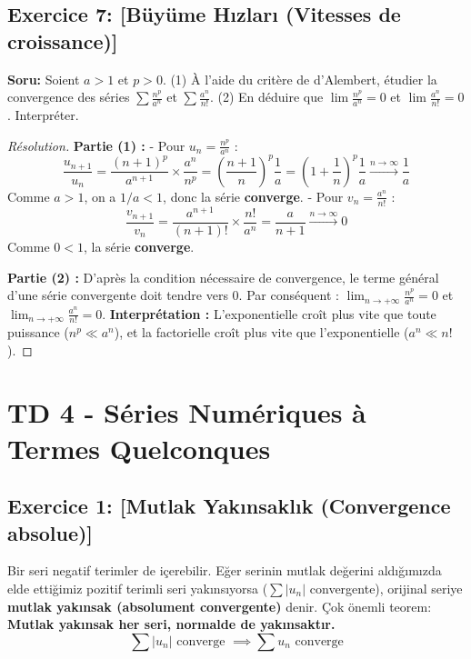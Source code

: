 \documentclass[12pt,a4paper]{report}
\begin{document}
\subsection*{Exercice 7: [Büyüme Hızları (Vitesses de croissance)]}

\textbf{Soru:}
Soient $a > 1$ et $p > 0$.
(1) À l'aide du critère de d'Alembert, étudier la convergence des séries $\sum \frac{n^p}{a^n}$ et $\sum \frac{a^n}{n!}$.
(2) En déduire que $\lim \frac{n^p}{a^n} = 0$ et $\lim \frac{a^n}{n!} = 0$. Interpréter.

\begin{proof}[Résolution]
\textbf{Partie (1) :}
- Pour $u_n = \frac{n^p}{a^n}$ :
\[ \frac{u_{n+1}}{u_n} = \frac{(n+1)^p}{a^{n+1}} \times \frac{a^n}{n^p} = \left(\frac{n+1}{n}\right)^p \frac{1}{a} = \left(1 + \frac{1}{n}\right)^p \frac{1}{a} \xrightarrow{n \to \infty} \frac{1}{a} \]
Comme $a > 1$, on a $1/a < 1$, donc la série \textbf{converge}.
- Pour $v_n = \frac{a^n}{n!}$ :
\[ \frac{v_{n+1}}{v_n} = \frac{a^{n+1}}{(n+1)!} \times \frac{n!}{a^n} = \frac{a}{n+1} \xrightarrow{n \to \infty} 0 \]
Comme $0 < 1$, la série \textbf{converge}.

\textbf{Partie (2) :}
D'après la condition nécessaire de convergence, le terme général d'une série convergente doit tendre vers 0.
Par conséquent : $\lim_{n \to +\infty} \frac{n^p}{a^n} = 0$ et $\lim_{n \to +\infty} \frac{a^n}{n!} = 0$.
\textbf{Interprétation :} L'exponentielle croît plus vite que toute puissance ($n^p \ll a^n$), et la factorielle croît plus vite que l'exponentielle ($a^n \ll n!$).
\end{proof}

\section{TD 4 - Séries Numériques à Termes Quelconques}

\subsection*{Exercice 1: [Mutlak Yakınsaklık (Convergence absolue)]}

\begin{tcolorbox}[colback=blue!5!white,colframe=blue!75!black,title=Hatırlatma (Rappel): Mutlak Yakınsaklık]
Bir seri negatif terimler de içerebilir. Eğer serinin mutlak değerini aldığımızda elde ettiğimiz pozitif terimli seri yakınsıyorsa ($\sum |u_n|$ convergente), orijinal seriye \textbf{mutlak yakınsak (absolument convergente)} denir.
Çok önemli teorem: \textbf{Mutlak yakınsak her seri, normalde de yakınsaktır.}
\[ \sum |u_n| \text{ converge } \implies \sum u_n \text{ converge} \]
\end{tcolorbox}
\end{document}

